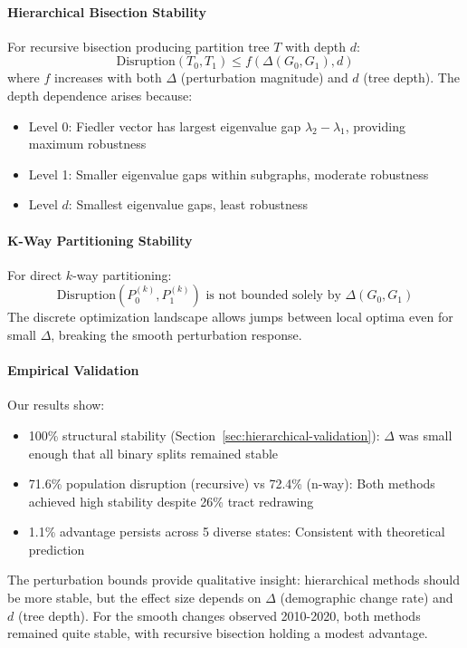 \paragraph{Hierarchical Bisection Stability} For recursive bisection producing partition tree $T$ with depth $d$:
\begin{equation}
\text{Disruption}(T_0, T_1) \leq f(\Delta(G_0, G_1), d)
\end{equation}
where $f$ increases with both $\Delta$ (perturbation magnitude) and $d$ (tree depth). The depth dependence arises because:
\begin{itemize}
\item Level 0: Fiedler vector has largest eigenvalue gap $\lambda_2 - \lambda_1$, providing maximum robustness~\citep{davis1970rotation}
\item Level 1: Smaller eigenvalue gaps within subgraphs, moderate robustness
\item Level $d$: Smallest eigenvalue gaps, least robustness
\end{itemize}

\paragraph{K-Way Partitioning Stability} For direct $k$-way partitioning:
\begin{equation}
\text{Disruption}(P_0^{(k)}, P_1^{(k)}) \text{ is not bounded solely by } \Delta(G_0, G_1)
\end{equation}
The discrete optimization landscape allows jumps between local optima even for small $\Delta$, breaking the smooth perturbation response.

\paragraph{Empirical Validation} Our results show:
\begin{itemize}
\item 100\% structural stability (Section~\ref{sec:hierarchical-validation}): $\Delta$ was small enough that all binary splits remained stable
\item 71.6\% population disruption (recursive) vs 72.4\% (n-way): Both methods achieved high stability despite 26\% tract redrawing
\item 1.1\% advantage persists across 5 diverse states: Consistent with theoretical prediction
\end{itemize}

The perturbation bounds provide qualitative insight: hierarchical methods should be more stable, but the effect size depends on $\Delta$ (demographic change rate) and $d$ (tree depth). For the smooth changes observed 2010-2020, both methods remained quite stable, with recursive bisection holding a modest advantage.

